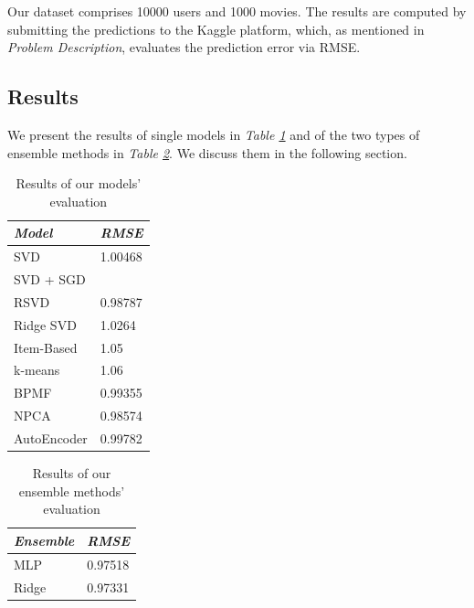 \documentclass[10pt,conference,compsocconf]{IEEEtran}
\begin{document}
Our dataset comprises 10000 users and 1000 movies. The results are computed by submitting the predictions to the Kaggle platform, which, as mentioned in \emph{Problem Description}, evaluates the prediction error via RMSE.

\subsection{Results}

We present the results of single models in \emph{Table \ref{tabres}} and of the two types of ensemble methods in \emph{Table \ref{ensres}}. We discuss them in the following section.

\begin{table}[h!]
	\centering
	\begin{tabular}{l|l}
		\textit{\textbf{Model}} & \textit{\textbf{RMSE}} \\
		\hline
		SVD                     &       1.00468                 \\
		SVD + SGD               &                        \\
		RSVD       	            &        0.98787                \\
		Ridge SVD               &        1.0264                \\
		Item-Based              &        1.05                \\
		k-means                 &        1.06                \\
		BPMF                    &        0.99355               \\
		NPCA                    &        0.98574          \\
		AutoEncoder             &        0.99782              
	\end{tabular}
\caption{Results of our models' evaluation}
\label{tabres}
\end{table}

\begin{table}[h!]
	\centering
	\begin{tabular}{l|l}
		\textit{\textbf{Ensemble}} & \textit{\textbf{RMSE}} \\
		\hline
		MLP                     &      0.97518                 \\
		Ridge      	            &         0.97331                                   
	\end{tabular}
\caption{Results of our ensemble methods' evaluation}
\label{ensres}
\end{table}
\end{document}

